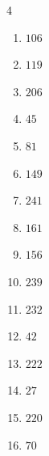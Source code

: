 \begin{multicols}{4}
\begin{enumerate}
  \item $106$


  \item $119$


  \item $206$


  \item $45$


  \item $81$


  \item $149$


  \item $241$


  \item $161$


  \item $156$


  \item $239$


  \item $232$


\columnbreak %

  \item $42$


  \item $222$


  \item $27$


  \item $220$


  \item $70$


\end{enumerate}
\end{multicols}
